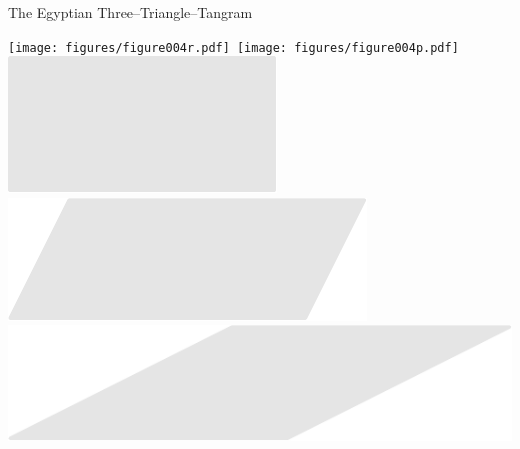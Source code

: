 \documentclass[14pt]{beamer}
\begin{document}
\begin{frame}{The Egyptian Three--Triangle--Tangram}
\begin{center}
            \texttt{[image: figures/figure004r.pdf]}\quad\,
            \texttt{[image: figures/figure004p.pdf]}\quad
            \includegraphics[scale=0.240]{figures/figure004a.pdf}\quad
            \includegraphics[scale=0.240]{figures/figure004h.pdf}\quad
            \includegraphics[scale=0.240]{figures/figure004i.pdf}\!\\

            \bigskip \bigskip


\end{center}
\end{frame}
\end{document}
